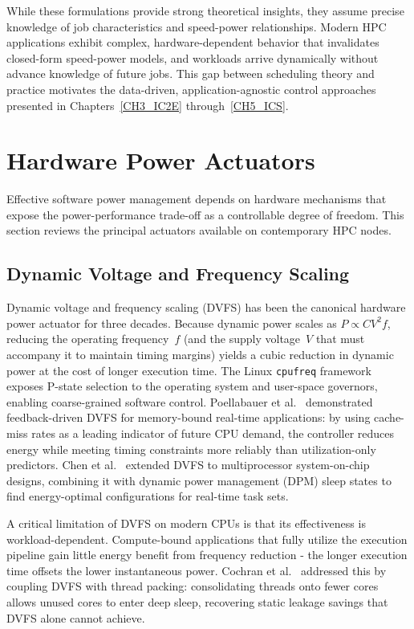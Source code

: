 While these formulations provide strong theoretical insights, they assume precise
knowledge of job characteristics and speed-power relationships.
Modern HPC applications exhibit complex, hardware-dependent behavior that
invalidates closed-form speed-power models, and workloads arrive dynamically
without advance knowledge of future jobs.
This gap between scheduling theory and practice motivates the data-driven,
application-agnostic control approaches presented in Chapters~\ref{CH3_IC2E}
through~\ref{CH5_ICS}.

\section{Hardware Power Actuators}

Effective software power management depends on hardware mechanisms that expose
the power-performance trade-off as a controllable degree of freedom.
This section reviews the principal actuators available on contemporary HPC nodes.

\subsection{Dynamic Voltage and Frequency Scaling}

Dynamic voltage and frequency scaling (DVFS) has been the canonical hardware
power actuator for three decades.
Because dynamic power scales as $P \propto C V^2 f$, reducing the operating
frequency~$f$ (and the supply voltage~$V$ that must accompany it to maintain
timing margins) yields a cubic reduction in dynamic power at the cost of longer
execution time.
The Linux \texttt{cpufreq} framework~\cite{wysocki2017cpufreq} exposes
P-state selection to the operating system and user-space governors, enabling
coarse-grained software control.
Poellabauer et al.~\cite{DVFS_Control} demonstrated feedback-driven DVFS for
memory-bound real-time applications: by using cache-miss rates as a leading
indicator of future CPU demand, the controller reduces energy while meeting
timing constraints more reliably than utilization-only predictors.
Chen et al.~\cite{DVFS_optimization} extended DVFS to multiprocessor
system-on-chip designs, combining it with dynamic power management (DPM)
sleep states to find energy-optimal configurations for real-time task sets.

A critical limitation of DVFS on modern CPUs is that its effectiveness is
workload-dependent.  Compute-bound applications that fully utilize the
execution pipeline gain little energy benefit from frequency reduction - the
longer execution time offsets the lower instantaneous power.
Cochran et al.~\cite{cochran2011pack} addressed this by coupling DVFS with
thread packing: consolidating threads onto fewer cores allows unused cores to
enter deep sleep, recovering static leakage savings that DVFS alone cannot
achieve.

